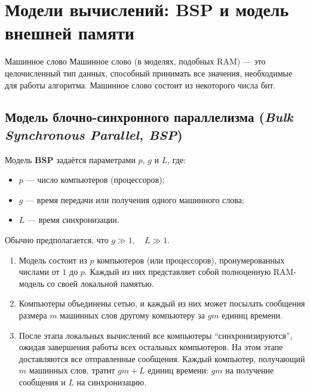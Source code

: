 
\section{Модели вычислений: BSP и модель внешней памяти}

\begin{Definition}{Машинное слово}{}
	Машинное слово (в моделях, подобных RAM) --- это целочисленный тип данных, способный принимать все значения, необходимые для работы алгоритма.
	Машинное слово состоит из некоторого числа бит.
\end{Definition}

\subsection{Модель блочно-синхронного параллелизма (\emph{Bulk Synchronous Parallel, BSP})}

Модель \textbf{BSP} задаётся параметрами \(p\), \(g\) и \(L\), где:
\begin{itemize}
	\item \(p\) --- число компьютеров (процессоров);
	\item \(g\) --- время передачи или получения одного машинного слова;
	\item \(L\) --- время синхронизации.
\end{itemize}

Обычно предполагается, что \(g \gg 1,\quad L \gg 1.\)

\begin{enumerate}
	\item Модель состоит из \(p\) компьютеров (или процессоров), пронумерованных числами от \(1\) до \(p\).
	Каждый из них представляет собой полноценную RAM-модель со своей локальной памятью.
	
	\item Компьютеры объединены сетью, и каждый из них может посылать сообщения размера \(m\) машинных слов другому компьютеру за \(gm\) единиц времени.
	
	\item После этапа локальных вычислений все компьютеры
	``синхронизируются'', ожидая завершения работы всех остальных
	компьютеров. На этом этапе доставляются все отправленные сообщения.
	Каждый компьютер, получающий \(m\) машинных слов, тратит \(gm + L\)
	единиц времени: \(gm\) на получение сообщения и \(L\) на синхронизацию.
\end{enumerate}

